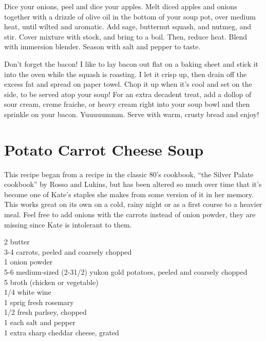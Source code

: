 Dice your onions, peel and dice your apples. Melt diced apples and onions
together with a drizzle of olive oil in the bottom of your soup pot, over medium
heat, until wilted and aromatic. Add sage, butternut squash, and nutmeg, and
stir. Cover mixture with stock, and bring to a boil. Then, reduce heat. Blend
with immersion blender. Season with salt and pepper to taste.

Don't forget the bacon! I like to lay bacon out flat on a baking sheet and stick
it into the oven while the squash is roasting. I let it crisp up, then drain off
the excess fat and spread on paper towel. Chop it up when it's cool and set on
the side, to be served atop your soup! For an extra decadent treat, add a dollop
of sour cream, creme fraiche, or heavy cream right into your soup bowl and then
sprinkle on your bacon. Yuuuuummm. Serve with warm, crusty bread and enjoy!

\section{Potato Carrot Cheese Soup}

\begin{open}
This recipe began from a recipe in the classic 80's cookbook, ``the Silver Palate cookbook'' by Rosso and Lukins, but has been altered so much over time that it's become one of Kate's staples she makes from some version of it in her memory. This works great on its own on a cold, rainy night or as a first course to a heavier meal. Feel free to add onions with the carrots instead of onion powder, they are missing since Kate is intolerant to them.
\end{open}
\begin{ingredients}
    \SI{2}{\tblspoon} butter\\
    3-4 carrots, peeled and coarsely chopped\\
    \SI{1}{\teaspoon} onion powder\\
    5-6 medium-sized (2-3\SI{1/2}{\pound}) yukon gold potatoes, peeled and coarsely chopped \\
    \SI{5}{\cup} broth (chicken or vegetable)\\
    \SI{1/4}{\cup} white wine \\ 
    1 sprig fresh rosemary \\
    \SI{1/2}{\cup} fresh parlsey, chopped\\ 
    \SI{1}{\teaspoon} each salt and pepper\\
    \SI{1}{\cup} extra sharp cheddar cheese, grated\\
\end{ingredients}


